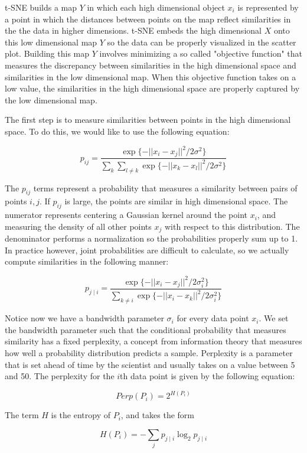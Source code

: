\documentclass{article}
\begin{document}
t-SNE builds a map $Y$ in which each high dimensional object $x_i$ is represented by a point in which the distances between points on the map reflect similarities in the the data in higher dimensions. t-SNE embeds the high dimensional $X$ onto this low dimensional map $Y$ so the data can be properly visualized in the scatter plot. Building this map $Y$ involves minimizing a so called "objective function" that measures the discrepancy between similarities in the high dimensional space and similarities in the low dimensional map. When this objective function takes on a low value, the similarities in the high dimensional space are properly captured by the low dimensional map.

The first step is to measure similarities between points in the high dimensional space. To do this, we would like to use the following equation: 

$$p_{ij} = \frac{\exp\{- ||x_i - x_j||^2 /2\sigma^2 \}}{\sum_{k}\sum_{l \not = k} \exp \{-||x_k - x_l||^2 /2\sigma^2 \}}$$

The $p_{ij}$ terms represent a probability that measures a similarity between pairs of points $i,j$. If $p_{ij}$ is large, the points are similar in high dimensional space. The numerator represents centering a Gaussian kernel around the point $x_i$, and measuring the density of all other points $x_j$ with respect to this distribution. The denominator performs a normalization so the probabilities properly sum up to 1. In practice however, joint probabilities are difficult to calculate, so we actually compute similarities in the following manner:

$$p_{j\mid i} = \frac{\exp\{- ||x_i - x_j||^2 /2\sigma_i^2 \}}{\sum_{k \not = i} \exp \{-||x_i - x_{k}||^2 /2\sigma_i^2 \}}$$

Notice now we have a bandwidth parameter $\sigma_i$ for every data point $x_i$. We set the bandwidth parameter such that the conditional probability that measures similarity has a fixed perplexity, a concept from information theory that measures how well a probability distribution predicts a sample. Perplexity is a parameter that is set ahead of time by the scientist and usually takes on a value between 5 and 50. The perplexity for the $i$th data point is given by the following equation: 

$$Perp(P_i) = 2^{H(P_i)}$$

The term $H$ is the entropy of $P_i$, and takes the form

$$H(P_i) = - \sum_{j} p_{j \mid i} \log_2 p_{j\mid i}$$
\end{document}
